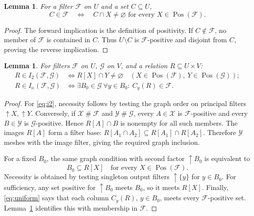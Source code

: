\documentclass[11pt,a4paper]{amsart}
\newtheorem{lemma}[theorem]{Lemma}
\theoremstyle{definition}
\theoremstyle{remark}
\newcommand{\Pos}{\operatorname{Pos}}
\newcommand{\cF}{\mathcal{F}}
\newcommand{\cG}{\mathcal{G}}
\newcommand{\cX}{\mathcal{X}}
\newcommand{\cY}{\mathcal{Y}}
\begin{document}
\begin{lemma}\label{lem:dual}
For a filter $\cF$ on $U$ and a set $C\subseteq U$,
\[
 C\in\cF
 \quad\Longleftrightarrow\quad
 C\cap X\ne\varnothing\text{ for every }X\in\Pos(\cF).
\]
\end{lemma}
\begin{proof}
The forward implication is the definition of positivity. If $C\notin\cF$,
no member of $\cF$ is contained in $C$. Thus $U\setminus C$ is
$\cF$-positive and disjoint from $C$, proving the reverse implication.
\end{proof}

\begin{lemma}\label{lem:indices}
For filters $\cF$ on $U$, $\cG$ on $V$, and a relation $R\subseteq U\times V$:
\begin{align}
 R\in I_2(\cF,\cG)
 &\Longleftrightarrow
 R[X]\cap Y\ne\varnothing
 \quad(X\in\Pos(\cF),\ Y\in\Pos(\cG));\label{eq:i2}\\
 R\in I_{\ltimes}(\cF,\cG)
 &\Longleftrightarrow
 \exists B_0\in\cG\ \forall y\in B_0:\ C_y(R)\in\cF.\label{eq:ilt}
\end{align}
\end{lemma}
\begin{proof}
For \eqref{eq:i2}, necessity follows by testing the graph order on principal
filters $\uparrow X,\uparrow Y$. Conversely, if
$\cX\mathrel{\#}\cF$ and $\cY\mathrel{\#}\cG$, every $A\in\cX$ is
$\cF$-positive and every $B\in\cY$ is $\cG$-positive. Hence $R[A]\cap B$
is nonempty for all such members. The images $R[A]$ form a filter base:
$R[A_1\cap A_2]\subseteq R[A_1]\cap R[A_2]$. Therefore $\cY$ meshes with
the image filter, giving the required graph inclusion.

For a fixed $B_0$, the same graph condition with second factor
$\uparrow B_0$ is equivalent to
\begin{equation}\label{eq:uniform}
 B_0\subseteq R[X]\quad\text{for every }X\in\Pos(\cF).
\end{equation}
Necessity is obtained by testing singleton output filters $\uparrow\{y\}$
for $y\in B_0$. For sufficiency, any set positive for $\uparrow B_0$ meets
$B_0$, so it meets $R[X]$. Finally, \eqref{eq:uniform} says that each column
$C_y(R)$, $y\in B_0$, meets every $\cF$-positive set. Lemma~\ref{lem:dual}
identifies this with membership in $\cF$.
\end{proof}
\end{document}
